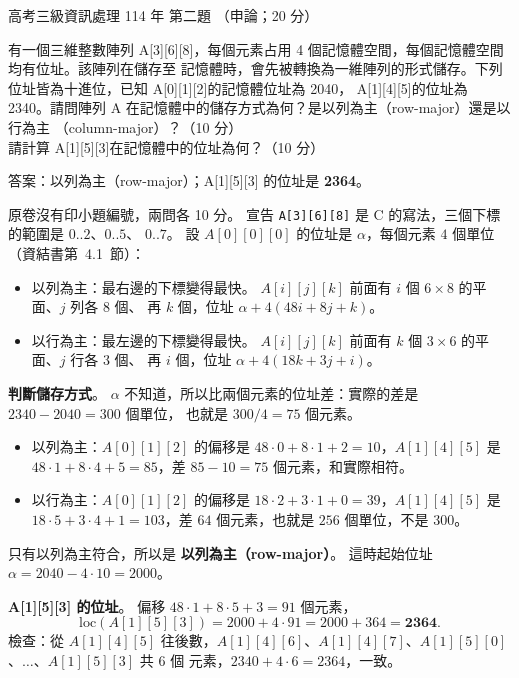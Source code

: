 \begin{pastexam}[label={px:gk3-114-ds-02}]{高考三級資訊處理 114 年 第二題}
（申論；20 分）

有一個三維整數陣列 A[3][6][8]，每個元素占用 4 個記憶體空間，每個記憶體空間均有位址。該陣列在儲存至
記憶體時，會先被轉換為一維陣列的形式儲存。下列位址皆為十進位，已知 A[0][1][2]的記憶體位址為 2040，
A[1][4][5]的位址為 2340。請問陣列 A 在記憶體中的儲存方式為何？是以列為主（row-major）還是以行為主
（column-major）？（10 分）\\
請計算 A[1][5][3]在記憶體中的位址為何？（10 分）
\end{pastexam}

\begin{pastsoln}
答案：以列為主（row-major）；A[1][5][3] 的位址是 \textbf{2364}。

原卷沒有印小題編號，兩問各 10 分。 宣告 \texttt{A[3][6][8]} 是 C 的寫法，三個下標的範圍是 $0..2$、$0..5$、
$0..7$。 設 $A[0][0][0]$ 的位址是 $\alpha$，每個元素 $4$ 個單位（資結書第~4.1~節）：
\begin{itemize}
\item 以列為主：最右邊的下標變得最快。 $A[i][j][k]$ 前面有 $i$ 個 $6 \times 8$ 的平面、$j$ 列各 $8$ 個、
再 $k$ 個，位址 $\alpha + 4(48i + 8j + k)$。
\item 以行為主：最左邊的下標變得最快。 $A[i][j][k]$ 前面有 $k$ 個 $3 \times 6$ 的平面、$j$ 行各 $3$ 個、
再 $i$ 個，位址 $\alpha + 4(18k + 3j + i)$。
\end{itemize}

\textbf{判斷儲存方式}。 $\alpha$ 不知道，所以比兩個元素的位址差：實際的差是 $2340 - 2040 = 300$ 個單位，
也就是 $300 / 4 = 75$ 個元素。
\begin{itemize}
\item 以列為主：$A[0][1][2]$ 的偏移是 $48 \cdot 0 + 8 \cdot 1 + 2 = 10$，$A[1][4][5]$ 是
$48 \cdot 1 + 8 \cdot 4 + 5 = 85$，差 $85 - 10 = 75$ 個元素，和實際相符。
\item 以行為主：$A[0][1][2]$ 的偏移是 $18 \cdot 2 + 3 \cdot 1 + 0 = 39$，$A[1][4][5]$ 是
$18 \cdot 5 + 3 \cdot 4 + 1 = 103$，差 $64$ 個元素，也就是 $256$ 個單位，不是 $300$。
\end{itemize}
只有以列為主符合，所以是 \textbf{以列為主（row-major）}。 這時起始位址
$\alpha = 2040 - 4 \cdot 10 = 2000$。

\textbf{A[1][5][3] 的位址}。 偏移 $48 \cdot 1 + 8 \cdot 5 + 3 = 91$ 個元素，
\[
\mathrm{loc}(A[1][5][3]) = 2000 + 4 \cdot 91 = 2000 + 364 = \mathbf{2364}.
\]
檢查：從 $A[1][4][5]$ 往後數，$A[1][4][6]$、$A[1][4][7]$、$A[1][5][0]$、$\ldots$、$A[1][5][3]$ 共 $6$ 個
元素，$2340 + 4 \cdot 6 = 2364$，一致。
\end{pastsoln}
